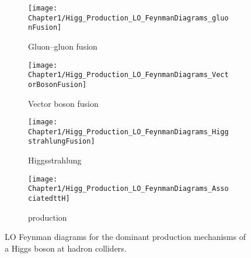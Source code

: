 \begin{figure}[h]
\centering
\begin{subfigure}{.23\textwidth}
  \centering
  \texttt{[image: Chapter1/Higg\_Production\_LO\_FeynmanDiagrams\_gluonFusion]}
  \caption{Gluon--gluon fusion}
  \label{fig:Chap1:Higgs:LOFeynman_A}
\end{subfigure}%
\begin{subfigure}{.23\textwidth}
  \centering
  \texttt{[image: Chapter1/Higg\_Production\_LO\_FeynmanDiagrams\_VectorBosonFusion]}
  \caption{Vector boson fusion}
  \label{fig:Chap1:Higgs:LOFeynman_B}
\end{subfigure}%
\begin{subfigure}{.23\textwidth}
  \centering
  \texttt{[image: Chapter1/Higg\_Production\_LO\_FeynmanDiagrams\_HiggstrahlungFusion]}
  \caption{Higgsstrahlung}
  \label{fig:Chap1:Higgs:LOFeynman_C}
\end{subfigure}%
\begin{subfigure}{.23\textwidth}
  \centering
  \texttt{[image: Chapter1/Higg\_Production\_LO\_FeynmanDiagrams\_AssociatedttH]}
  \caption{\ttH production}
  \label{fig:Chap1:Higgs:LOFeynman_D}
\end{subfigure}%
\caption{LO Feynman diagrams for the dominant production mechanisms of a Higgs boson at hadron colliders.}
\label{fig:Chap1:Higgs:LOFeynman}
\end{figure}

